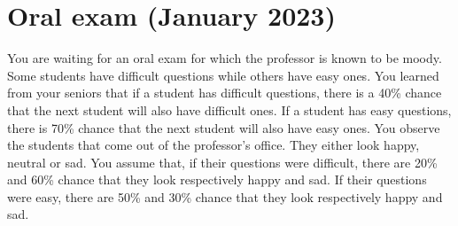 \documentclass[11pt, a4paper]{article}
\begin{document}
\newpage

\section{Oral exam (January 2023)}

You are waiting for an oral exam for which the professor is known to be moody. Some students have difficult questions while others have easy ones. You learned from your seniors that if a student has difficult questions, there is a 40\% chance that the next student will also have difficult ones. If a student has easy questions, there is 70\% chance that the next student will also have easy ones. You observe the students that come out of the professor's office. They either look happy, neutral or sad. You assume that, if their questions were difficult, there are 20\% and 60\% chance that they look respectively happy and sad. If their questions were easy, there are 50\% and 30\% chance that they look respectively happy and sad.
\end{document}
